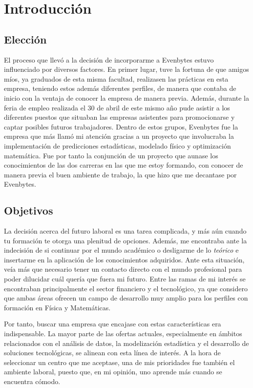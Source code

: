 \chapter{Introducción}
%
%
\section{Elección} \label{eleccion}
%
%
El proceso que llevó a la decisión de incorporarme a Evenbytes estuvo influenciado por diversos factores. En primer lugar, tuve la fortuna de que amigos míos, ya graduados de esta misma facultad, realizasen las prácticas en esta empresa, teniendo estos además diferentes perfiles, de manera que contaba de inicio con la ventaja de conocer la empresa de manera previa. Además, durante la feria de empleo realizada el 30 de abril de este mismo año pude asistir a los diferentes puestos que situaban las empresas asistentes para promocionarse y captar posibles futuros trabajadores. Dentro de estos grupos, Evenbytes fue la empresa que más llamó mi atención gracias a un proyecto que involucraba la implementación de predicciones estadísticas, modelado físico y optimización matemática. Fue por tanto la conjunción de un proyecto que aunase los conocimientos de las dos carreras en las que me estoy formando, con conocer de manera previa el buen ambiente de trabajo, la que hizo que me decantase por Evenbytes.
%
%
\section{Objetivos} \label{objetivos}
%
%
La decisión acerca del futuro laboral es una tarea complicada, y más aún cuando tu formación te otorga una plenitud de opciones. Además, me encontraba ante la indecisión de si continuar por el mundo académico o desligarme de lo \textit{teórico} e insertarme en la aplicación de los conocimientos adquiridos. Ante esta situación, veía más que necesario tener un contacto directo con el mundo profesional para poder dilucidar cuál quería que fuera mi futuro. Entre las ramas de mi interés se encontraban principalmente el sector financiero y el tecnológico, ya que considero que ambas áreas ofrecen un campo de desarrollo muy amplio para los perfiles con formación en Física y Matemáticas.

Por tanto, buscar una empresa que encajase con estas características era indispensable. La mayor parte de las ofertas actuales, especialmente en ámbitos relacionados con el análisis de datos, la modelización estadística y el desarrollo de soluciones tecnológicas, se alinean con esta línea de interés. A la hora de seleccionar un centro que me aceptase, una de mis prioridades fue también el ambiente laboral, puesto que, en mi opinión, uno aprende más cuando se encuentra cómodo.

